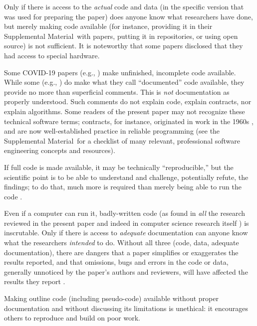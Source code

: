 \documentclass[10pt,letterpaper]{article}
\def \citeeg#1{(e.g., \cite{#1})}
\def\supplement{Supplemental Material}
\begin{document}
Only if there is access to the \emph{actual\/} code and data (in the specific version that was used for preparing the paper) does anyone know what researchers have done, but merely making code available (for instance, providing it in their \supplement\ with papers, putting it in repositories, or using open source) is not sufficient. It is noteworthy that some papers disclosed that they had access to special hardware.

Some COVID-19 papers \citeeg{unfinished} make unfinished, incomplete code available. While some \citeeg{unfinished,lancet-unfinished} do make what they call ``documented'' code available, they provide no more than superficial comments. This is \emph{not\/} documentation as properly understood. Such comments do not explain code, explain contracts, nor explain algorithms. Some readers of the present paper may not recognize these technical software terms; contracts, for instance, originated in work in the 1960s \cite{hoare}, and are now well-established practice in reliable programming {(see the \supplement\ for a checklist of many relevant, professional software engineering concepts and resources)}.

If full code is made available, it may be technically ``reproducible,'' but the scientific point is to be able to understand and challenge, potentially refute, the findings; to do that, much more is required than merely being able to run the code \cite{notebooks,popper}.

Even if a computer can run it, badly-written code (as found in \emph{all\/} the research reviewed in the present paper {and indeed in computer science research itself \cite{machine-learning-reproducibility}}) is inscrutable. Only if there is access to \emph{adequate\/} documentation can anyone know what the researchers \emph{intended\/} to do. Without all three (code, data, adequate documentation), there are dangers that a paper simplifies or exaggerates the results reported, and that omissions, bugs and errors in the code or data, generally unnoticed by the paper's authors and reviewers, will have affected the results they report \cite{relit}. 

Making outline code (including pseudo-code) available without proper documentation and without discussing its limitations is unethical: it encourages others to reproduce and build on poor work. 

\makeatletter
\long{}
\makeatother
\end{document}

